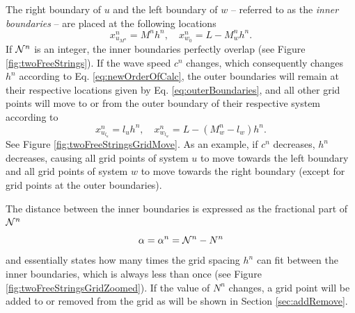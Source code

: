 The right boundary of $u$ and the left boundary of $w$ -- referred to as the \textit{inner boundaries} -- are placed at the following locations 
\begin{equation}\label{eq:hLocs}
    x_{u_{M^n}}^n = M^nh^n, \quad x_{w_{0}}^n = L-M_w^nh^n.
\end{equation}
If $\mathcal{N}^n$ is an integer, the inner boundaries perfectly overlap (see Figure \ref{fig:twoFreeStrings}). If the wave speed $c^n$ changes, which consequently changes $h^n$ according to Eq. \eqref{eq:newOrderOfCalc}, the outer boundaries will remain at their respective locations given by Eq. \eqref{eq:outerBoundaries}, and all other grid points will move to or from the outer boundary of their respective system according to 
\begin{equation}\label{eq:hLocs}
    x_{u_{l_u}}^n =l_uh^n, \quad x_{w_{l_w}}^n = L-(M_w^n-l_w)h^n.
\end{equation}
See Figure \ref{fig:twoFreeStringsGridMove}. As an example, if $c^n$ decreases, $h^n$ decreases, causing all grid points of system $u$ to move towards the left boundary and all grid points of system $w$ to move towards the right boundary (except for grid points at the outer boundaries).

The distance between the inner boundaries is expressed as the fractional part of $\mathcal{N}^n$
\begin{equation}\label{eq:alphaDef}
    \alpha = \alpha^n = \mathcal{N}^n - N^n
\end{equation}
and essentially states how many times the grid spacing $h^n$ can fit between the inner boundaries, which is always less than once (see Figure \ref{fig:twoFreeStringsGridZoomed}). If the value of $N^n$ changes, a grid point will be added to or removed from the grid as will be shown in Section \ref{sec:addRemove}.

